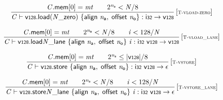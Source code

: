 $$
\begin{array}{@{}c@{}}\displaystyle
\frac{
{\mathit{C}}.\mathsf{mem}{}[0] = {\mathit{mt}}
 \qquad
{2^{{\mathit{n}}_{{\mathsf{a}}}}} < {\mathit{N}} / 8
}{
{\mathit{C}} \vdash {\mathsf{v{\scriptstyle128}.load}}{({{{\mathit{N}}}{\mathsf{\_}}}{\mathsf{zero}})}~\{ \begin{array}[t]{@{}l@{}}
\mathsf{align}~{\mathit{n}}_{{\mathsf{a}}},\; \mathsf{offset}~{\mathit{n}}_{{\mathsf{o}}} \}\end{array} : \mathsf{i{\scriptstyle32}} \rightarrow \mathsf{v{\scriptstyle128}}
} \, {[\textsc{\scriptsize T{-}vload{-}zero}]}
\qquad
\end{array}
$$

$$
\begin{array}{@{}c@{}}\displaystyle
\frac{
{\mathit{C}}.\mathsf{mem}{}[0] = {\mathit{mt}}
 \qquad
{2^{{\mathit{n}}_{{\mathsf{a}}}}} < {\mathit{N}} / 8
 \qquad
{\mathit{i}} < 128 / {\mathit{N}}
}{
{\mathit{C}} \vdash {{{\mathsf{v{\scriptstyle128}.load}}{{\mathit{N}}}}{\mathsf{\_}}}{\mathsf{lane}}~\{ \begin{array}[t]{@{}l@{}}
\mathsf{align}~{\mathit{n}}_{{\mathsf{a}}},\; \mathsf{offset}~{\mathit{n}}_{{\mathsf{o}}} \}\end{array}~{\mathit{i}} : \mathsf{i{\scriptstyle32}}~\mathsf{v{\scriptstyle128}} \rightarrow \mathsf{v{\scriptstyle128}}
} \, {[\textsc{\scriptsize T{-}vload\_lane}]}
\qquad
\end{array}
$$

$$
\begin{array}{@{}c@{}}\displaystyle
\frac{
{\mathit{C}}.\mathsf{mem}{}[0] = {\mathit{mt}}
 \qquad
{2^{{\mathit{n}}_{{\mathsf{a}}}}} \leq {|\mathsf{v{\scriptstyle128}}|} / 8
}{
{\mathit{C}} \vdash \mathsf{v{\scriptstyle128}.store}~\{ \begin{array}[t]{@{}l@{}}
\mathsf{align}~{\mathit{n}}_{{\mathsf{a}}},\; \mathsf{offset}~{\mathit{n}}_{{\mathsf{o}}} \}\end{array} : \mathsf{i{\scriptstyle32}}~\mathsf{v{\scriptstyle128}} \rightarrow \epsilon
} \, {[\textsc{\scriptsize T{-}vstore}]}
\qquad
\end{array}
$$

$$
\begin{array}{@{}c@{}}\displaystyle
\frac{
{\mathit{C}}.\mathsf{mem}{}[0] = {\mathit{mt}}
 \qquad
{2^{{\mathit{n}}_{{\mathsf{a}}}}} < {\mathit{N}} / 8
 \qquad
{\mathit{i}} < 128 / {\mathit{N}}
}{
{\mathit{C}} \vdash {{{\mathsf{v{\scriptstyle128}.store}}{{\mathit{N}}}}{\mathsf{\_}}}{\mathsf{lane}}~\{ \begin{array}[t]{@{}l@{}}
\mathsf{align}~{\mathit{n}}_{{\mathsf{a}}},\; \mathsf{offset}~{\mathit{n}}_{{\mathsf{o}}} \}\end{array}~{\mathit{i}} : \mathsf{i{\scriptstyle32}}~\mathsf{v{\scriptstyle128}} \rightarrow \epsilon
} \, {[\textsc{\scriptsize T{-}vstore\_lane}]}
\qquad
\end{array}
$$

